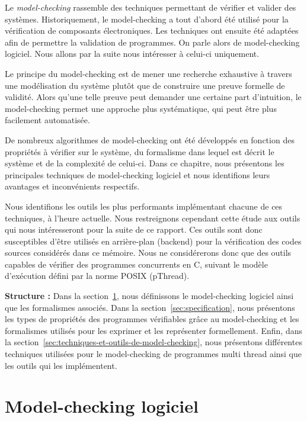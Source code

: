 \label{sec:RevLitt}

Le \emph{model-checking} rassemble des techniques permettant de vérifier
et valider des systèmes. Historiquement, le model-checking a
tout d'abord été utilisé pour la vérification de composants
électroniques. Les techniques ont ensuite été adaptées afin de permettre
la validation de programmes. On parle alors de model-checking logiciel.
Nous allons par la suite nous intéresser à celui-ci uniquement.

Le principe du model-checking est de mener une recherche
exhaustive à travers une modélisation du système plutôt que de
construire une preuve formelle de validité. Alors qu'une telle preuve
peut demander une certaine part d'intuition, le model-checking permet
une approche plus systématique, qui peut être plus facilement
automatisée.

De nombreux algorithmes de model-checking ont été développés en fonction
des propriétés à vérifier sur le système, du formalisme dans lequel est
décrit le système et de la complexité de celui-ci.
Dans ce chapitre, nous présentons les principales techniques de
model-checking logiciel et nous identifions leurs avantages et
inconvénients respectifs.

Nous identifions les outils les plus performants implémentant chacune de ces
techniques, à l'heure actuelle. Nous restreignons cependant cette étude aux
outils qui nous intéresseront pour la suite de ce rapport. Ces outils sont donc
susceptibles d'être utilisés en arrière-plan (backend) pour la vérification des
codes sources considérés dans ce mémoire. Nous ne considérerons donc que
des outils capables de vérifier des programmes concurrents en C, suivant le
modèle d'exécution défini par la norme POSIX (pThread).

\textbf{Structure :} Dans la section~\ref{sec:model-checking-logiciel}, nous
définissons le model-checking logiciel ainsi que les formalismes associés.
Dans la section~\ref{sec:specification}, nous présentons
les types de propriétés des programmes vérifiables grâce au model-checking et
les formalismes utilisés pour les exprimer et les représenter formellement.
Enfin, dans la section~\ref{sec:techniques-et-outils-de-model-checking}, nous
présentons différentes techniques utilisées pour le model-checking de programmes
multi thread ainsi que les outils qui les implémentent.

\section{Model-checking logiciel}\label{sec:model-checking-logiciel}

